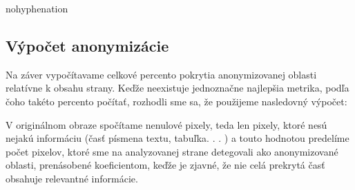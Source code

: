 \begin{hyphenrules}{nohyphenation}
\begin{figure}[H]
\begin{minipage}[b]{.4\linewidth}
\end{minipage}
\end{figure}

\subsection{Výpočet anonymizácie}
Na záver vypočítavame celkové percento pokrytia anonymizovanej oblasti relatívne k obsahu strany. Keďže neexistuje jednoznačne najlepšia metrika, podľa čoho takéto percento počítať, rozhodli sme sa, že použijeme nasledovný výpočet: 

V originálnom obraze spočítame nenulové pixely, teda len pixely, ktoré nesú nejakú informáciu 
(časť písmena textu, tabuľka. . . ) a touto hodnotou predelíme počet pixelov, ktoré sme na analyzovanej 
strane detegovali ako anonymizované oblasti, prenásobené koeficientom, keďže je zjavné, že nie celá 
prekrytá časť obsahuje relevantné informácie.
\newline


\end{hyphenrules}
